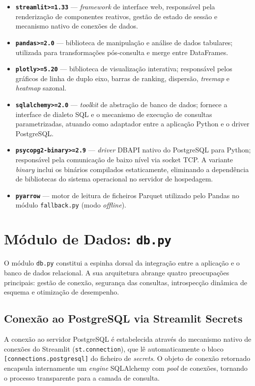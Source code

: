 \documentclass[12pt,a4paper]{report}
\begin{document}
\begin{itemize}
    \item \textbf{\texttt{streamlit>=1.33}} — \textit{framework} de interface web,
    responsável pela renderização de componentes reativos, gestão de estado de sessão e
    mecanismo nativo de conexões de dados.
    \item \textbf{\texttt{pandas>=2.0}} — biblioteca de manipulação e análise de dados
    tabulares; utilizada para transformações pós-consulta e merge entre DataFrames.
    \item \textbf{\texttt{plotly>=5.20}} — biblioteca de visualização interativa;
    responsável pelos gráficos de linha de duplo eixo, barras de ranking,
    dispersão, \textit{treemap} e \textit{heatmap} sazonal.
    \item \textbf{\texttt{sqlalchemy>=2.0}} — \textit{toolkit} de abstração de banco de
    dados; fornece a interface de dialeto SQL e o mecanismo de execução de consultas
    parametrizadas, atuando como adaptador entre a aplicação Python e o driver
    PostgreSQL.
    \item \textbf{\texttt{psycopg2-binary>=2.9}} — \textit{driver} DBAPI nativo do
    PostgreSQL para Python; responsável pela comunicação de baixo nível via socket TCP.
    A variante \textit{binary} inclui os binários compilados estaticamente,
    eliminando a dependência de bibliotecas do sistema operacional no servidor de
    hospedagem.
    \item \textbf{\texttt{pyarrow}} — motor de leitura de ficheiros Parquet utilizado
    pelo Pandas no módulo \texttt{fallback.py} (modo \textit{offline}).
\end{itemize}

\section{Módulo de Dados: \texttt{db.py}}

O módulo \texttt{db.py} constitui a espinha dorsal da integração entre a aplicação e o
banco de dados relacional. A sua arquitetura abrange quatro preocupações principais:
gestão de conexão, segurança das consultas, introspecção dinâmica de esquema e
otimização de desempenho.

\subsection{Conexão ao PostgreSQL via Streamlit Secrets}

A conexão ao servidor PostgreSQL é estabelecida através do mecanismo nativo de
conexões do Streamlit (\texttt{st.connection}), que lê automaticamente o bloco
\texttt{[connections.postgresql]} do ficheiro de \textit{secrets}. O objeto de
conexão retornado encapsula internamente um \textit{engine} SQLAlchemy com
\textit{pool} de conexões, tornando o processo transparente para a camada de consulta.
\end{document}
